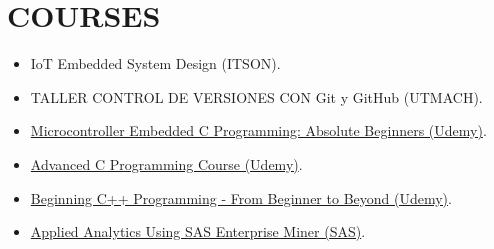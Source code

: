 \documentclass[11pt,a4paper,roman]{moderncv}        %
\begin{document}
\section{COURSES}
\begin{minipage}{\maincolumnwidth}%
	\small{
    	    \begin{itemize}
                \item IoT Embedded System Design (ITSON).
                \item TALLER CONTROL DE VERSIONES CON Git y GitHub (UTMACH).
                \item \href{https://www.udemy.com/certificate/UC-53d5c877-04d2-4b79-ab2c-2dc091caf41d/}{Microcontroller Embedded C Programming: Absolute Beginners (Udemy)}.
                \item \href{https://www.udemy.com/certificate/UC-a0c51e31-a412-4255-9dbe-035201b0c226/}{Advanced C Programming Course (Udemy)}.
                \item \href{https://www.udemy.com/certificate/UC-c83b1e33-8fa8-4c80-9ff5-60deabb5e3f2/}{Beginning C++ Programming - From Beginner to Beyond (Udemy)}.
                \item \href{https://www.credly.com/badges/3ced7099-d631-4f90-bdfe-5238bf774d04/public_url}{Applied Analytics Using SAS Enterprise Miner (SAS)}.
            \end{itemize}
            }
\end{minipage}%
      

\bigbreak
\nocite{*}

\end{document}
